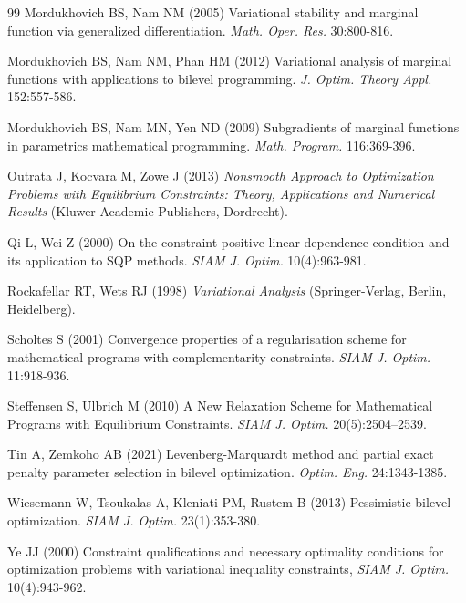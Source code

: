 \begin{thebibliography}{99}
	 Mordukhovich BS, Nam NM (2005) Variational stability and
	marginal function via generalized differentiation. \emph{Math. Oper. Res.} 30:800-816.
	
	 Mordukhovich BS, Nam  NM, Phan HM  (2012) Variational
	analysis of marginal functions with applications to bilevel programming. \emph{J. Optim. Theory  Appl.} 152:557-586.

Mordukhovich BS, Nam MN, Yen ND (2009) Subgradients of
	marginal functions in parametrics mathematical programming. \emph{Math. Program.} 116:369-396.
		
	 Outrata J, Kocvara M, Zowe J (2013)   \emph{Nonsmooth Approach to Optimization Problems with Equilibrium Constraints: Theory, Applications and Numerical Results}  (Kluwer Academic Publishers, Dordrecht).
	
	 Qi L, Wei Z (2000) On the constraint positive linear dependence
	condition and its application to SQP methods. \emph{SIAM J. Optim.} 10(4):963-981.
	
	 Rockafellar  RT, Wets RJ (1998)  \emph{Variational Analysis} (Springer-Verlag, Berlin, Heidelberg).
	
	 Scholtes S (2001) Convergence properties of a regularisation scheme for
	mathematical programs with complementarity constraints. \emph{SIAM J. Optim.} 11:918-936.
	
	Steffensen S, Ulbrich M (2010) A New Relaxation Scheme
	for Mathematical Programs with Equilibrium Constraints. \emph{SIAM J. Optim.} 20(5):2504--2539. %
	
	
	
 Tin A, Zemkoho  AB (2021)
	Levenberg-Marquardt method and partial exact penalty parameter selection in
	bilevel optimization. \emph{Optim. Eng.} 24:1343-1385.
	
 Wiesemann  W, Tsoukalas  A,  Kleniati PM,  Rustem B (2013)   Pessimistic bilevel optimization. \emph{SIAM J. Optim.} 23(1):353-380.


	
 Ye JJ (2000) Constraint qualifications and necessary optimality
	conditions for optimization problems with variational inequality constraints,
	\emph{SIAM J. Optim.} 10(4):943-962.


\end{thebibliography}
